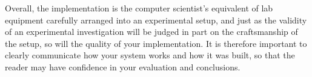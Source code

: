 Overall, the implementation is the computer scientist's equivalent of 
lab equipment carefully arranged into an experimental setup, and just
as the validity of an experimental investigation will be judged in
part on the craftsmanship of the setup, so will the quality of your
implementation. It is therefore important to clearly communicate how
your system works and how it was built, so that the reader may have
confidence in your evaluation and conclusions.






